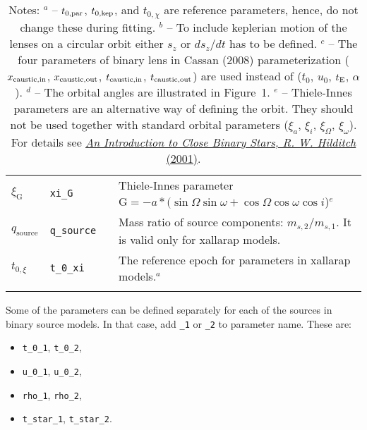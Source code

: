 \documentclass[12pt]{article}
\begin{document}
\begin{landscape}
\begin{longtable}{l l l p{12cm}}
$\xi_{\mathrm{G}}$ & \texttt{xi\_G} & & Thiele-Innes parameter $\mathrm{G} = -a* (\sin \Omega  \sin \omega + \cos \Omega \cos \omega \cos i$)$^e$ \\
$q_\mathrm{source}$ & \texttt{q\_source} & & Mass ratio of source components: $m_{s,2}/m_{s,1}$. It is valid only for xallarap models.\\
$t_{0,\xi}$ & \texttt{t\_0\_xi} & &  The reference epoch for parameters in xallarap models.$^a$\\
\hline
\caption{Notes: \newline
$^a$ -- $t_{0,{\rm par}}$, $t_{0,{\rm kep}}$, and $t_{0,\chi}$ are reference parameters, hence, do not change these during fitting. \newline
$^b$ -- To include keplerian motion of the lenses on a circular orbit either $s_{z}$ or $ds_{z}/dt$ has to be defined. \newline
$^c$ -- The four parameters of binary lens in Cassan (2008) parameterization ($x_{\rm caustic, in}$, $x_{\rm caustic, out}$, $t_{\rm caustic, in}$, $t_{\rm caustic, out}$) are used instead of ($t_0$, $u_0$, $t_{\rm E}$, $\alpha$). \newline
$^d$ -- The orbital angles are illustrated in Figure~1.\newline
$^e$ -- Thiele-Innes parameters are an alternative way of defining the orbit. They should not be used together with standard orbital parameters ($\xi_a$, $\xi_i$, $\xi_\Omega$, $\xi_\omega$). For   details see \href{https://ui.adsabs.harvard.edu/abs/2001icbs.book.....H}{\textit{An Introduction to Close Binary Stars, R. W. Hilditch} (2001)}.
}

\end{longtable}
\end{landscape}

Some of the parameters can be defined separately for each of the sources in binary source models.  
In that case, add {\tt \_1} or {\tt \_2} to parameter name. These are:
\begin{itemize}
\item {\tt t\_0\_1}, {\tt t\_0\_2},
\item {\tt u\_0\_1}, {\tt u\_0\_2},
\item {\tt rho\_1}, {\tt rho\_2},
\item {\tt t\_star\_1}, {\tt t\_star\_2}.
\end{itemize}
\end{document}
